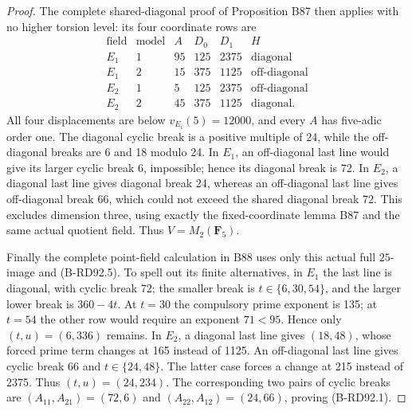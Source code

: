 \begin{proof}
The complete shared-diagonal proof of Proposition B87 then applies
with no higher torsion level: its four coordinate rows are
\[
\begin{array}{c|c|r|r|r|c}
 \text{field}&\text{model}&A&D_0&D_1&H\\\hline
 E_1&1&95&125&2375&\text{diagonal}\\
 E_1&2&15&375&1125&\text{off-diagonal}\\
 E_2&1&5&125&2375&\text{off-diagonal}\\
 E_2&2&45&375&1125&\text{diagonal}.
\end{array}                                             \tag{B-RD92.5}
\]
All four displacements are below \(v_{E_i}(5)=12000\), and every
\(A\) has five-adic order one. The diagonal cyclic break is a
positive multiple of 24, while the off-diagonal breaks are 6 and
18 modulo 24. In \(E_1\), an off-diagonal last line would give its
larger cyclic break 6, impossible; hence its diagonal break is 72.
In \(E_2\), a diagonal last line gives diagonal break 24, whereas
an off-diagonal last line gives off-diagonal break 66, which could
not exceed the shared diagonal break 72. This excludes dimension
three, using exactly the fixed-coordinate lemma B87 and the same
actual quotient field. Thus \(V=M_2(\mathbf F_5)\).

Finally the complete point-field calculation in B88 uses only this
actual full \(25\)-image and (B-RD92.5). To spell out its finite
alternatives, in \(E_1\) the last line is diagonal, with cyclic
break 72; the smaller break is \(t\in\{6,30,54\}\), and the
larger lower break is \(360-4t\). At \(t=30\) the compulsory
prime exponent is 135; at \(t=54\) the other row would require
an exponent \(71<95\). Hence only \((t,u)=(6,336)\) remains.
In \(E_2\), a diagonal last line gives \((18,48)\), whose forced
prime term changes at 165 instead of 1125. An off-diagonal last
line gives cyclic break 66 and \(t\in\{24,48\}\). The latter
case forces a change at 215 instead of 2375. Thus
\((t,u)=(24,234)\). The corresponding two pairs of cyclic
breaks are \((A_{11},A_{21})=(72,6)\) and
\((A_{22},A_{12})=(24,66)\), proving (B-RD92.1).
\end{proof}

